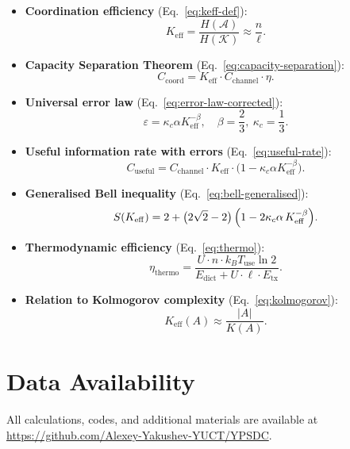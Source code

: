 \documentclass[12pt,a4paper]{article}
\theoremstyle{remark}
\newcommand{\Keff}{K_{\mathrm{eff}}}
\begin{document}
	\begin{itemize}
		\item \textbf{Coordination efficiency} (Eq.~\eqref{eq:keff-def}):
		\[
		\Keff = \frac{H(\mathcal{A})}{H(\mathcal{K})} \approx \frac{n}{\ell}.
		\]
		
		\item \textbf{Capacity Separation Theorem} (Eq.~\eqref{eq:capacity-separation}):
		\[
		C_{\text{coord}} = \Keff \cdot C_{\text{channel}} \cdot \eta.
		\]
		
		\item \textbf{Universal error law} (Eq.~\eqref{eq:error-law-corrected}):
		\[
		\varepsilon = \kappa_c \alpha K_{\mathrm{eff}}^{-\beta}, \quad \beta = \frac{2}{3},\ \kappa_c = \frac{1}{3}.
		\]
		
		\item \textbf{Useful information rate with errors} (Eq.~\eqref{eq:useful-rate}):
		\[
		C_{\text{useful}} = C_{\text{channel}} \cdot \Keff \cdot \bigl(1 - \kappa_c \alpha K_{\mathrm{eff}}^{-\beta}\bigr).
		\]
		
		\item \textbf{Generalised Bell inequality} (Eq.~\eqref{eq:bell-generalised}):
		\[
		S(K_{\mathrm{eff}}) = 2 + \bigl(2\sqrt{2}-2\bigr)\,\Bigl(1 - 2\kappa_c\alpha\,K_{\mathrm{eff}}^{-\beta}\Bigr).
		\]
		
		\item \textbf{Thermodynamic efficiency} (Eq.~\eqref{eq:thermo}):
		\[
		\eta_{\text{thermo}} = \frac{U \cdot n \cdot k_B T_{\text{use}} \ln 2}{E_{\text{dict}} + U \cdot \ell \cdot E_{\text{tx}}}.
		\]
		
		\item \textbf{Relation to Kolmogorov complexity} (Eq.~\eqref{eq:kolmogorov}):
		\[
		\Keff(A) \approx \frac{|A|}{K(A)}.
		\]
	\end{itemize}
	
	\section*{Data Availability}
	
	All calculations, codes, and additional materials are available at \url{https://github.com/Alexey-Yakushev-YUCT/YPSDC}.
	
\end{document}
